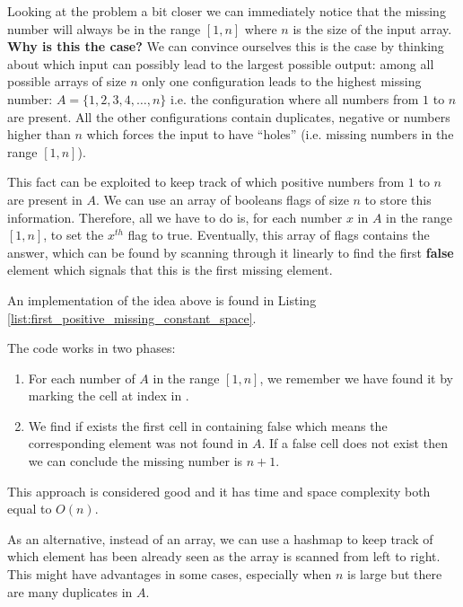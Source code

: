 Looking at the problem a bit closer we can immediately notice that the missing number will always be
in the range $[1,n]$ where $n$ is the size of the input array. \textbf{Why is this the case?} 
We can convince ourselves this is the case by thinking about which input can possibly lead to the largest possible output: among
all possible arrays of size $n$ only one configuration leads to the highest missing number: $A =
\{1,2,3,4, \ldots ,n\}$ i.e. the configuration where all numbers from $1$ to $n$ are present. All the other configurations contain duplicates,
negative or numbers higher than $n$ which forces the input to have ``holes'' (i.e. missing numbers in the range $[1,n]$). 

This fact can be exploited to keep track of which positive numbers from
$1$ to $n$ are present in $A$. We can use an array of booleans flags of size $n$ to store this information. Therefore, all we have to do is, for each number  $x$ in $A$ in the range $[1,n]$, to set the $x^{th}$ flag to true.
Eventually, this array of flags contains the answer, which can be found by scanning through it linearly to find the first \textbf{false} element which signals that this is the first missing element.

An implementation of the idea above is found in Listing \ref{list:first_positive_missing_constant_space}.




The code works in two phases:
\begin{enumerate}
	\item For each number  of $A$ in the range $[1,n]$, we remember we have found it by marking the cell at index  in .
	\item We find if exists the first cell in  containing false which means the corresponding element was not found in $A$. If a false cell does not exist then we can conclude the missing number is $n+1$.
\end{enumerate}

This approach is considered good and it has time and space complexity both equal to $O(n)$.

As an alternative, instead of an array, we can use a hashmap to keep track of which element has
been already seen as the array is scanned from left to right. This might have advantages in some cases, especially when $n$ is large but there are many duplicates in $A$. 


